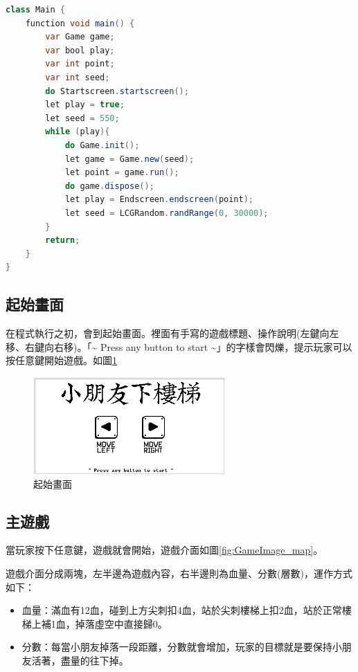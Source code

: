 \documentclass[12pt,a4paper]{article}
\begin{document}
\begin{lstlisting}[language=java, label={code:Main.jack}, caption = Main.jack]
class Main {
    function void main() {
        var Game game;
        var bool play;
        var int point;
        var int seed;
        do Startscreen.startscreen();
        let play = true;
        let seed = 550;
        while (play){
            do Game.init();
            let game = Game.new(seed);
            let point = game.run();
            do game.dispose();
            let play = Endscreen.endscreen(point);
            let seed = LCGRandom.randRange(0, 30000);
        }
        return;
    }
}
\end{lstlisting}

\newpage
\subsection{起始畫面}
在程式執行之初，會到起始畫面。裡面有手寫的遊戲標題、操作說明(左鍵向左移、右鍵向右移)。「\~{} Press any button to start \~{}」的字樣會閃爍，提示玩家可以按任意鍵開始遊戲。如圖\ref{fig:GameImage_Startscreen}

\begin{figure}[H]
\centering
\includegraphics[width=0.65\textwidth]{GameImage_Startscreen.png}
\caption{\label{fig:GameImage_Startscreen}起始畫面}
\end{figure}

\subsection{主遊戲}
當玩家按下任意鍵，遊戲就會開始，遊戲介面如圖\ref{fig:GameImage_map}。

遊戲介面分成兩塊，左半邊為遊戲內容，右半邊則為血量、分數(層數)，運作方式如下：

\begin{itemize}
\item 血量：滿血有12血，碰到上方尖刺扣4血，站於尖刺樓梯上扣2血，站於正常樓梯上補1血，掉落虛空中直接歸0。
\item 分數：每當小朋友掉落一段距離，分數就會增加，玩家的目標就是要保持小朋友活著，盡量的往下掉。
\end{itemize}
\end{document}
